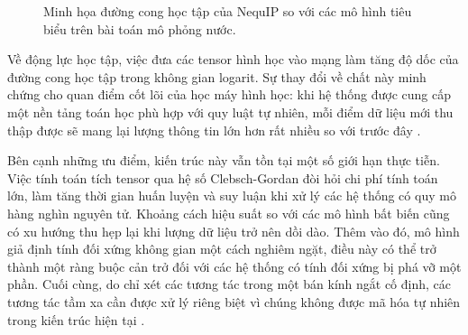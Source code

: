 \begin{figure}[H]
\centering
{}
\caption{Minh họa đường cong học tập của NequIP so với các mô hình tiêu biểu trên bài toán mô phỏng nước.}
\label{fig:nequip-learning-curve}
\end{figure}

Về động lực học tập, việc đưa các tensor hình học vào mạng làm tăng độ dốc của đường cong học tập trong không gian logarit. Sự thay đổi về chất này minh chứng cho quan điểm cốt lõi của học máy hình học: khi hệ thống được cung cấp một nền tảng toán học phù hợp với quy luật tự nhiên, mỗi điểm dữ liệu mới thu thập được sẽ mang lại lượng thông tin lớn hơn rất nhiều so với trước đây \cite{batzner2022nequip}.

Bên cạnh những ưu điểm, kiến trúc này vẫn tồn tại một số giới hạn thực tiễn. Việc tính toán tích tensor qua hệ số Clebsch-Gordan đòi hỏi chi phí tính toán lớn, làm tăng thời gian huấn luyện và suy luận khi xử lý các hệ thống có quy mô hàng nghìn nguyên tử. Khoảng cách hiệu suất so với các mô hình bất biến cũng có xu hướng thu hẹp lại khi lượng dữ liệu trở nên dồi dào. Thêm vào đó, mô hình giả định tính đối xứng không gian một cách nghiêm ngặt, điều này có thể trở thành một ràng buộc cản trở đối với các hệ thống có tính đối xứng bị phá vỡ một phần. Cuối cùng, do chỉ xét các tương tác trong một bán kính ngắt cố định, các tương tác tầm xa cần được xử lý riêng biệt vì chúng không được mã hóa tự nhiên trong kiến trúc hiện tại \cite{batzner2022nequip}.

